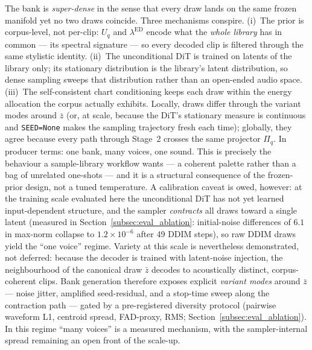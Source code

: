 \documentclass[12pt,a4paper]{article}
\begin{document}
The bank is \emph{super-dense} in the sense that every draw lands on the
same frozen manifold yet no two draws coincide. Three mechanisms
conspire. (i)~The prior is corpus-level, not per-clip: $U_q$ and
$\lambda^{\mathrm{ED}}$ encode what the \emph{whole library} has in
common — its spectral signature — so every decoded clip is filtered
through the same stylistic identity. (ii)~The unconditional DiT is
trained on latents of the library only; its stationary distribution is
the library's latent distribution, so dense sampling sweeps that
distribution rather than an open-ended audio space. (iii)~The
self-consistent chart conditioning keeps each draw within the energy
allocation the corpus actually exhibits. Locally, draws differ through
the variant modes around $\bar{z}$ (or, at scale, because the DiT's
stationary measure is continuous and \texttt{SEED=None} makes the
sampling trajectory fresh each time);
globally, they agree because every path through Stage~2 crosses the same
projector $\Pi_q$. In producer terms: one bank, many voices, one sound.
This is precisely the behaviour a sample-library workflow wants — a
coherent palette rather than a bag of unrelated one-shots — and it is a
structural consequence of the frozen-prior design, not a tuned
temperature. A calibration caveat is owed, however: at the training
scale evaluated here the unconditional DiT has not yet learned
input-dependent structure, and the sampler \emph{contracts} all draws
toward a single latent (measured in
Section~\ref{subsec:eval_ablation}: initial-noise differences of $6.1$
in max-norm collapse to $1.2\times10^{-6}$ after 49 DDIM steps), so
raw DDIM draws yield the ``one voice'' regime. Variety at this scale is
nevertheless demonstrated, not deferred: because the decoder is trained
with latent-noise injection, the neighbourhood of the canonical draw
$\bar{z}$ decodes to acoustically distinct, corpus-coherent clips.
Bank generation therefore exposes explicit \emph{variant modes} around
$\bar{z}$ — noise jitter, amplified seed-residual, and a stop-time
sweep along the contraction path — gated by a pre-registered diversity
protocol (pairwise waveform L1, centroid spread, FAD-proxy, RMS;
Section~\ref{subsec:eval_ablation}). In this regime ``many voices'' is
a measured mechanism, with the sampler-internal spread remaining an
open front of the scale-up.
\end{document}
